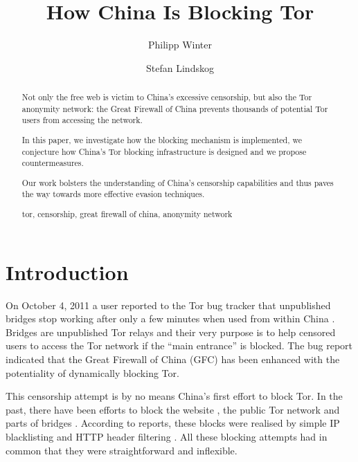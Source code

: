 \documentclass[runningheads,a4paper]{llncs}
\newcommand{\keywords}[1]{\par\addvspace\baselineskip
\noindent\keywordname\enspace\ignorespaces#1}
\begin{document}
\mainmatter

\title{How China Is Blocking Tor}

\author{Philipp Winter \and Stefan Lindskog}




\maketitle

\begin{abstract}
Not only the free web is victim to China's excessive censorship, but also the Tor anonymity network:
the Great Firewall of China prevents thousands of potential Tor users from accessing the network.

In this paper, we investigate how the blocking mechanism is implemented, we conjecture how China's
Tor blocking infrastructure is designed and we propose countermeasures.

Our work bolsters the understanding of China's censorship capabilities and thus paves the way
towards more effective evasion techniques.
\keywords{tor, censorship, great firewall of china, anonymity network}
\end{abstract}

\section{Introduction}
\label{sec:introduction}
On October 4, 2011 a user reported to the Tor bug tracker that unpublished bridges stop working
after only a few minutes when used from within China \cite{ticket1}. Bridges are unpublished Tor
relays and their very purpose is to help censored users to access the Tor network if the ``main
entrance'' is blocked. The bug report indicated that the Great Firewall of China (GFC) has been
enhanced with the potentiality of dynamically blocking Tor.

This censorship attempt is by no means China's first effort to block Tor. In the past, there have
been efforts to block the website \cite{tpo2}, the public Tor network \cite{tpo1,tpo3} and parts of
bridges \cite{tpo4}. According to reports, these blocks were realised by simple IP blacklisting
and HTTP header filtering \cite{tpo2}. All these blocking attempts had in common that
they were straightforward and inflexible.
\end{document}
